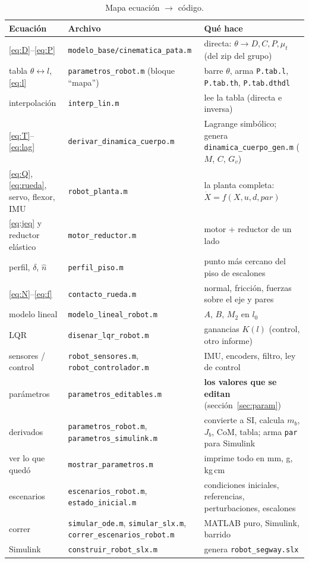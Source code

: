 \documentclass[11pt,a4paper]{article}
\newcommand{\code}[1]{\texttt{#1}}
\begin{document}
\begin{table}[H]
  \centering\footnotesize
  \begin{tabular}{>{\raggedright\arraybackslash}p{3.3cm} >{\raggedright\arraybackslash}p{5.4cm} >{\raggedright\arraybackslash}p{7.3cm}}
    \toprule
    Ecuación & Archivo & Qué hace \\
    \midrule
    \eqref{eq:D}--\eqref{eq:P} & \code{modelo\_base/cinematica\_pata.m} & directa: $\theta \to D, C, P, \mu_t$ (del zip del grupo) \\
    tabla $\theta \leftrightarrow l$, \eqref{eq:l} & \code{parametros\_robot.m} (bloque ``mapa'') & barre $\theta$, arma \code{P.tab.l}, \code{P.tab.th}, \code{P.tab.dthdl} \\
    interpolación & \code{interp\_lin.m} & lee la tabla (directa e inversa) \\
    \eqref{eq:T}--\eqref{eq:lag} & \code{derivar\_dinamica\_cuerpo.m} & Lagrange simbólico; genera \code{dinamica\_cuerpo\_gen.m} ($M$, $C$, $G_v$) \\
    \eqref{eq:Q}, \eqref{eq:rueda}, servo, flexor, IMU & \code{robot\_planta.m} & la planta completa: $\dot X = f(X, u, d, par)$ \\
    \eqref{eq:jeq} y reductor elástico & \code{motor\_reductor.m} & motor + reductor de un lado \\
    perfil, $\delta$, $\hat n$ & \code{perfil\_piso.m} & punto más cercano del piso de escalones \\
    \eqref{eq:N}--\eqref{eq:f} & \code{contacto\_rueda.m} & normal, fricción, fuerzas sobre el eje y pares \\
    modelo lineal & \code{modelo\_lineal\_robot.m} & $A$, $B$, $M_2$ en $l_0$ \\
    LQR & \code{disenar\_lqr\_robot.m} & ganancias $K(l)$ (control, otro informe) \\
    sensores / control & \code{robot\_sensores.m}, \code{robot\_controlador.m} & IMU, encoders, filtro, ley de control \\
    parámetros & \code{parametros\_editables.m} & \textbf{los valores que se editan} (sección~\ref{sec:param}) \\
    derivados & \code{parametros\_robot.m}, \code{parametros\_simulink.m} & convierte a SI, calcula $m_b$, $J_b$, CoM, tabla; arma \code{par} para Simulink \\
    ver lo que quedó & \code{mostrar\_parametros.m} & imprime todo en mm, g, kg\,cm \\
    escenarios & \code{escenarios\_robot.m}, \code{estado\_inicial.m} & condiciones iniciales, referencias, perturbaciones, escalones \\
    correr & \code{simular\_ode.m}, \code{simular\_slx.m}, \code{correr\_escenarios\_robot.m} & MATLAB puro, Simulink, barrido \\
    Simulink & \code{construir\_robot\_slx.m} & genera \code{robot\_segway.slx} \\
    \bottomrule
  \end{tabular}
  \caption{Mapa ecuación $\to$ código.}
\end{table}
\end{document}
